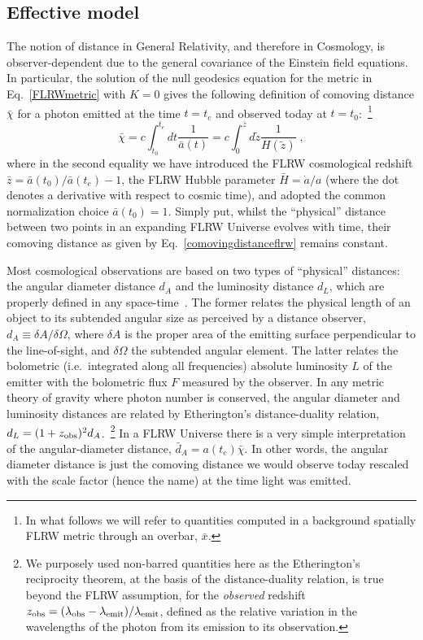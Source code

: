 \documentclass[notitlepage,nofootinbib]{revtex4-1}
\begin{document}
\subsection{Effective model}
The notion of distance in General Relativity, and therefore in Cosmology, is observer-dependent due to the general covariance of the Einstein field equations.  In particular, the solution of the null geodesics equation for the metric in Eq.~\eqref{FLRWmetric} with $K=0$ gives the following definition of comoving distance $\bar{\chi}$  for a photon emitted at the time $t=t_e$ and observed today at $t=t_0$:~\footnote{In what follows we will refer to quantities computed in a background spatially FLRW metric through an overbar, $\bar{x}$.}
\begin{equation}\label{comovingdistanceflrw}
    \bar{\chi}=c\int_{t_0}^{t_e} dt \frac{1}{\bar{a}(t)} = c\int_0^{\bar{z}}  d\tilde{z} \frac{1}{H(\tilde{z})}\;,
\end{equation}
where in the second equality we have introduced the FLRW cosmological redshift $\bar{z}=\bar{a}(t_0)/\bar{a}(t_e) -1$, the FLRW Hubble parameter $\bar{H} = \dot{a}/a$ (where the dot denotes a derivative with respect to cosmic time), and adopted the common normalization choice $\bar{a}(t_0)=1$. Simply put, whilst the ``physical'' distance between two points in an expanding FLRW Universe evolves with time, their comoving distance as given by Eq.~\eqref{comovingdistanceflrw} remains constant. 

Most cosmological observations are based on two types of ``physical'' distances: the angular diameter distance $d_A$ and the luminosity distance $d_L$, which are properly defined in any space-time~\cite{Perlick:2010zh}. The former relates the physical length of an object to its subtended angular size as perceived by a distance observer, $d_A \equiv \delta A/\delta \Omega$, where $\delta A$ is the proper area of the emitting surface perpendicular to the line-of-sight, and $\delta \Omega$ the subtended angular element. The latter relates the bolometric (i.e.\ integrated along all frequencies) absolute luminosity  $L$ of the emitter with the bolometric flux $F$ measured by the observer. In any metric theory of gravity where photon number is conserved, the angular diameter and luminosity distances are related by Etherington's distance-duality relation, $d_L = (1+z_{\rm obs})^2 d_A$.~\footnote{We purposely used non-barred quantities here as the Etherington's reciprocity theorem, at the basis of the distance-duality relation, is true beyond the FLRW assumption, for the \textit{observed} redshift $z_{\rm {obs}} = (\lambda_{\rm{obs}} -\lambda_{\rm{emit}})/\lambda_{\rm{emit}}$, defined as the relative variation in the wavelengths of the photon from its emission to its observation.} In a FLRW Universe there is a very simple interpretation of the angular-diameter distance, $\bar{d}_A = a(t_e) \bar{\chi}$. In other words, the angular diameter distance is just the comoving distance we would observe today rescaled with the scale factor (hence the name) at the time light was emitted.
 
\end{document}
